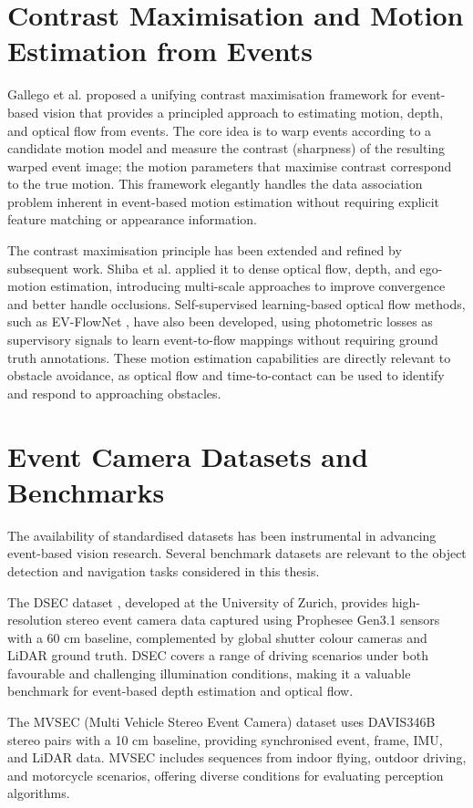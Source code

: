 \documentclass[11pt, a4paper]{report}
\begin{document}
\section{Contrast Maximisation and Motion Estimation from Events}
Gallego et al. \cite{gallego2018unifying} proposed a unifying contrast maximisation framework for event-based vision that provides a principled approach to estimating motion, depth, and optical flow from events. The core idea is to warp events according to a candidate motion model and measure the contrast (sharpness) of the resulting warped event image; the motion parameters that maximise contrast correspond to the true motion. This framework elegantly handles the data association problem inherent in event-based motion estimation without requiring explicit feature matching or appearance information. 

The contrast maximisation principle has been extended and refined by subsequent work. Shiba et al. \cite{shiba2024secrets} applied it to dense optical flow, depth, and ego-motion estimation, introducing multi-scale approaches to improve convergence and better handle occlusions. Self-supervised learning-based optical flow methods, such as EV-FlowNet \cite{zhu2018evflownet}, have also been developed, using photometric losses as supervisory signals to learn event-to-flow mappings without requiring ground truth annotations. These motion estimation capabilities are directly relevant to obstacle avoidance, as optical flow and time-to-contact can be used to identify and respond to approaching obstacles.

\section{Event Camera Datasets and Benchmarks}
The availability of standardised datasets has been instrumental in advancing event-based vision research. Several benchmark datasets are relevant to the object detection and navigation tasks considered in this thesis. 

The DSEC dataset \cite{gehrig2021dsec}, developed at the University of Zurich, provides high-resolution stereo event camera data captured using Prophesee Gen3.1 sensors with a 60 cm baseline, complemented by global shutter colour cameras and LiDAR ground truth. DSEC covers a range of driving scenarios under both favourable and challenging illumination conditions, making it a valuable benchmark for event-based depth estimation and optical flow. 

The MVSEC (Multi Vehicle Stereo Event Camera) dataset \cite{zhu2018multivehicle} uses DAVIS346B stereo pairs with a 10 cm baseline, providing synchronised event, frame, IMU, and LiDAR data. MVSEC includes sequences from indoor flying, outdoor driving, and motorcycle scenarios, offering diverse conditions for evaluating perception algorithms. 
\end{document}

